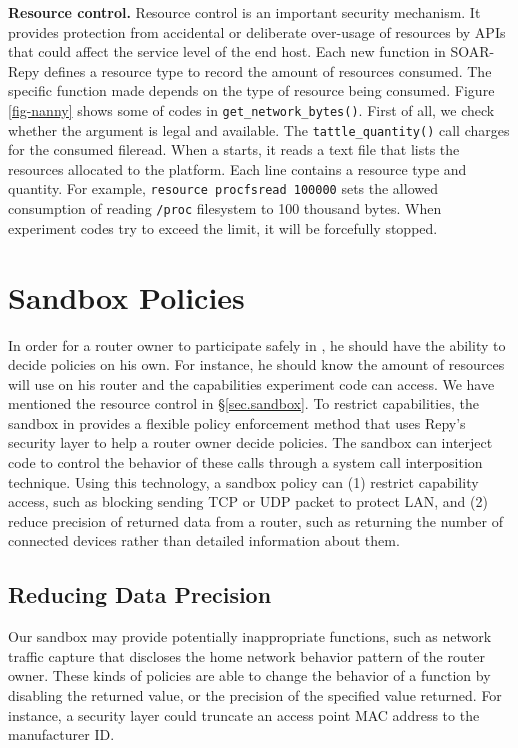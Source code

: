 \textbf{Resource control.} Resource control is an important security mechanism.
 It provides protection from accidental or deliberate over-usage of resources by
APIs that could affect the service level of the end host. Each new function
in SOAR-Repy defines a resource type to record the amount of resources consumed.
The specific function made depends on the type of resource being consumed.
Figure \ref{fig-nanny} shows some of codes in \texttt{get\_network\_bytes()}.
First of all, we check whether the argument is legal and available.
The \texttt{tattle\_quantity()} call charges for the consumed fileread.
When a \sysname starts, it reads a text file that lists the resources
allocated to the platform. Each line contains a resource type and quantity.
 For example, \texttt{resource procfsread 100000} sets the allowed consumption
  of reading \texttt{/proc} filesystem to 100 thousand bytes. When experiment codes
   try to exceed the limit, it will be forcefully stopped.

\section{Sandbox Policies}
\label{sec.policy}
In order for a router owner to participate safely in \sysname, he should have
the ability to decide policies on his own. For instance, he should know the
 amount of resources \sysname will use on his router and the capabilities
  experiment code can access. We have mentioned the resource control
  in \S{\ref{sec.sandbox}}. To restrict capabilities, the sandbox in \sysname
  provides a flexible policy enforcement method that uses Repy's security layer
   to help a router owner decide policies. The sandbox can interject code to
    control the behavior of these calls through a system call interposition
    technique. Using this technology, a sandbox policy can (1) restrict capability
     access, such as blocking sending TCP or UDP packet to protect LAN,
     and (2) reduce precision of returned data from a router, such as returning
      the number of connected devices rather than detailed information about them.

\subsection{Reducing Data Precision}
Our sandbox may provide potentially inappropriate functions, such as network
 traffic capture that discloses the home network behavior pattern of the router
  owner. These kinds of policies are able to change the behavior of a function by
   disabling the returned value, or the precision of the specified value returned.
    For instance, a security layer could truncate an access point MAC address to the manufacturer ID.

